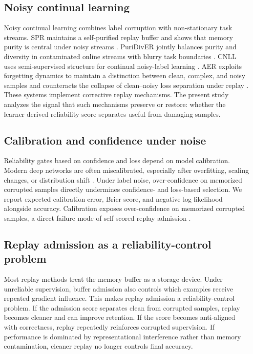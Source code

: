 \documentclass[preprint,12pt]{elsarticle}
\begin{document}
\subsection{Noisy continual learning}

Noisy continual learning combines label corruption with non-stationary task streams. SPR maintains a self-purified replay buffer and shows that memory purity is central under noisy streams \cite{Kim2021SPR}. PuriDivER jointly balances purity and diversity in contaminated online streams with blurry task boundaries \cite{Bang2022PuriDivER}. CNLL uses semi-supervised structure for continual noisy-label learning \cite{Karim2022CNLL}. AER exploits forgetting dynamics to maintain a distinction between clean, complex, and noisy samples and counteracts the collapse of clean--noisy loss separation under replay \cite{Millunzi2024AER}. These systems implement corrective replay mechanisms. The present study analyzes the signal that such mechanisms preserve or restore: whether the learner-derived reliability score separates useful from damaging samples.

\subsection{Calibration and confidence under noise}

Reliability gates based on confidence and loss depend on model calibration. Modern deep networks are often miscalibrated, especially after overfitting, scaling changes, or distribution shift \cite{Guo2017Calibration,Minderer2021RevisitingCalibration}. Under label noise, over-confidence on memorized corrupted samples directly undermines confidence- and loss-based selection. We report expected calibration error, Brier score, and negative log likelihood alongside accuracy. Calibration exposes over-confidence on memorized corrupted samples, a direct failure mode of self-scored replay admission \cite{Brier1950Verification}.

\subsection{Replay admission as a reliability-control problem}

Most replay methods treat the memory buffer as a storage device. Under unreliable supervision, buffer admission also controls which examples receive repeated gradient influence. This makes replay admission a reliability-control problem. If the admission score separates clean from corrupted samples, replay becomes cleaner and can improve retention. If the score becomes anti-aligned with correctness, replay repeatedly reinforces corrupted supervision. If performance is dominated by representational interference rather than memory contamination, cleaner replay no longer controls final accuracy.
\end{document}
